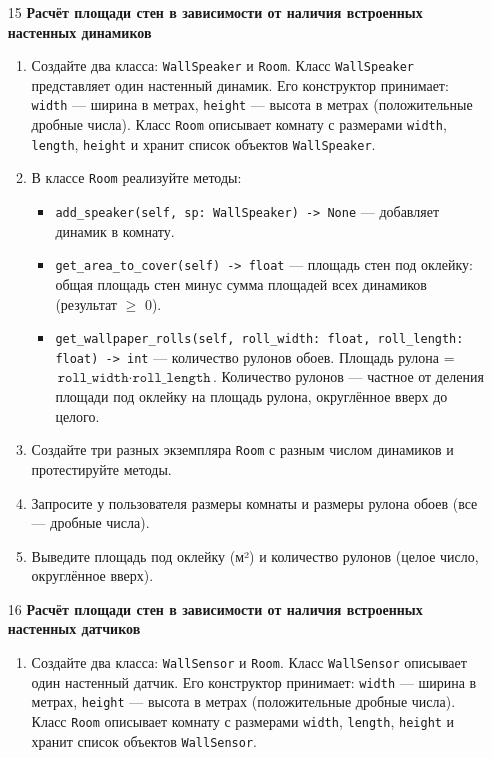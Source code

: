 \begin{enumerate}
\item[15] \textbf{Расчёт площади стен в зависимости от наличия встроенных настенных динамиков}
\begin{enumerate}
    \item Создайте два класса: \texttt{WallSpeaker} и \texttt{Room}.  
    Класс \texttt{WallSpeaker} представляет один настенный динамик. Его конструктор принимает:  
    \texttt{width} — ширина в метрах,  
    \texttt{height} — высота в метрах (положительные дробные числа).  
    Класс \texttt{Room} описывает комнату с размерами \texttt{width}, \texttt{length}, \texttt{height} и хранит список объектов \texttt{WallSpeaker}.

    \item В классе \texttt{Room} реализуйте методы:  
    \begin{itemize}
        \item \texttt{add\_speaker(self, sp: WallSpeaker) -> None} — добавляет динамик в комнату.
        \item \texttt{get\_area\_to\_cover(self) -> float} — площадь стен под оклейку: общая площадь стен минус сумма площадей всех динамиков (результат $\geqslant$ 0).
        \item \texttt{get\_wallpaper\_rolls(self, roll\_width: float, roll\_length: float) -> int} — количество рулонов обоев. Площадь рулона = \(\texttt{roll\_width} \cdot \texttt{roll\_length}\). Количество рулонов — частное от деления площади под оклейку на площадь рулона, округлённое вверх до целого.
    \end{itemize}

    \item Создайте три разных экземпляра \texttt{Room} с разным числом динамиков и протестируйте методы.

    \item Запросите у пользователя размеры комнаты и размеры рулона обоев (все — дробные числа).

    \item Выведите площадь под оклейку (м²) и количество рулонов (целое число, округлённое вверх).
\end{enumerate}

\item[16] \textbf{Расчёт площади стен в зависимости от наличия встроенных настенных датчиков}
\begin{enumerate}
    \item Создайте два класса: \texttt{WallSensor} и \texttt{Room}.  
    Класс \texttt{WallSensor} описывает один настенный датчик. Его конструктор принимает:  
    \texttt{width} — ширина в метрах,  
    \texttt{height} — высота в метрах (положительные дробные числа).  
    Класс \texttt{Room} описывает комнату с размерами \texttt{width}, \texttt{length}, \texttt{height} и хранит список объектов \texttt{WallSensor}.


\end{enumerate}
\end{enumerate}
